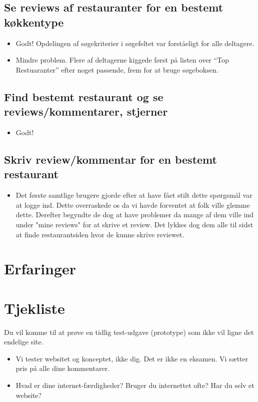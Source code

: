 \documentclass[a4paper, 12pt]{article}
\begin{document}
\subsection{Se reviews af restauranter for en bestemt køkkentype}
\begin{itemize}
\item Godt! Opdelingen af søgekriterier i søgefeltet var forståeligt for alle deltagere.
\item Mindre problem. Flere af deltagerne kiggede først på listen over ``Top Restuaranter'' efter noget passende, frem for at bruge søgeboksen. 
\end{itemize}

\subsection{Find bestemt restaurant og se reviews/kommentarer, stjerner}
\begin{itemize}
\item Godt! 
\end{itemize}

\subsection{Skriv review/kommentar for en bestemt restaurant}
\begin{itemize}
\item Det første samtlige brugere gjorde efter at have fået stilt dette spørgsmål
var at logge ind. Dette overraskede os da vi havde forventet at folk ville glemme
dette. Derefter begyndte de dog at have problemer da mange af dem ville ind under
"mine reviews" for at skrive et review. Det lykkes dog dem alle til sidst at finde
restaurantsiden hvor de kunne skrive reviewet.
\end{itemize}


\section{Erfaringer}
\label{sec:Erfaringer}

\clearpage
\appendix

\section{Tjekliste}

Du vil komme til at prøve en tidlig test-udgave (prototype) som ikke vil ligne
det endelige site.
\begin{itemize}
\item Vi tester websitet og konceptet, ikke dig. Det er ikke en
  eksamen. Vi sætter pris på alle dine kommentarer.
\item Hvad er dine internet-færdigheder? Bruger du internettet ofte?
  Har du selv et website?
\end{itemize}
\end{document}
